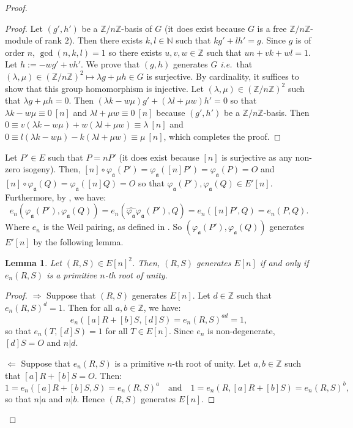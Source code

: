 \documentclass[a4paper,10pt]{report}
\theoremstyle{definition}
\theoremstyle{plain}
\newtheorem{Lemma}[Definition]{Lemma}
\theoremstyle{definition}
\newcommand{\ie}{\emph{i.e.}\ }
\newcommand{\N}{\mathbb{N}}
\newcommand{\Z}{\mathbb{Z}}
\renewcommand{\(}{\left(}
\renewcommand{\)}{\right)}
\newcommand{\mf}[1]{\mathfrak{#1}}
\begin{document}
\begin{proof}
\begin{proof}
Let $(g',h')$ be a $\Z/n\Z$-basis of $G$ (it does exist because $G$ is a free $\Z/n\Z$-module of rank $2$). Then there exists $k,l\in\N$ such that $kg'+lh'=g$. Since $g$ is of order $n$, $\gcd(n,k,l)=1$ so there exists $u,v,w\in\Z$ such that $un+vk+wl=1$. Let $h:=-wg'+vh'$. We prove that $(g,h)$ generates $G$ \ie that $(\lambda,\mu)\in(\Z/n\Z)^2\longmapsto \lambda g+\mu h\in G$ is surjective. By cardinality, it suffices to show that this group homomorphism is injective. Let $(\lambda,\mu)\in(\Z/n\Z)^2$ such that $\lambda g+\mu h=0$. Then $(\lambda k-w\mu)g'+(\lambda l+\mu w)h'=0$ so that $\lambda k-w\mu\equiv 0 \ [n]$ and $\lambda l+\mu w\equiv 0 \ [n]$ because $(g',h')$ be a $\Z/n\Z$-basis.  Then $0\equiv v(\lambda k-w\mu)+w(\lambda l+\mu w)\equiv \lambda \ [n]$ and $0\equiv l(\lambda k-w\mu)-k(\lambda l+\mu w)\equiv \mu \ [n]$, which completes the proof.
\end{proof}

Let $P'\in E$ such that $P=nP'$ (it does exist because $[n]$ is surjective as any non-zero isogeny). Then, $[n]\circ\varphi_{\mf{a}}(P')=\varphi_{\mf{a}}([n]P')=\varphi_{\mf{a}}(P)=O$ and $[n]\circ\varphi_{\mf{a}}(Q)=\varphi_{\mf{a}}([n]Q)=O$ so that $\varphi_{\mf{a}}(P'),\varphi_{\mf{a}}(Q)\in E'[n]$. Furthermore, by \cite[Proposition III.8.2]{Silverman1}, we have:
\[e_n(\varphi_{\mf{a}}(P'),\varphi_{\mf{a}}(Q))=e_n(\widehat{\varphi_{\mf{a}}}\varphi_{\mf{a}}(P'),Q)=e_n([n]P',Q)=e_n(P,Q).\]
Where $e_n$ is the Weil pairing, as defined in \cite[III.8]{Silverman1}. So $(\varphi_{\mf{a}}(P'),\varphi_{\mf{a}}(Q))$ generates $E'[n]$ by the following lemma.

\begin{Lemma}
Let $(R,S)\in E[n]^2$. Then, $(R,S)$ generates $E[n]$ if and only if $e_n(R,S)$ is a primitive $n$-th root of unity.
\end{Lemma}

\begin{proof}
$\Longrightarrow$ Suppose that $(R,S)$ generates $E[n]$. Let $d\in\Z$ such that $e_n(R,S)^d=1$. Then for all $a, b\in \Z$, we have:
\[e_n([a]R+[b]S,[d]S)=e_n(R,S)^{ad}=1,\]
so that $e_n(T,[d]S)=1$ for all $T\in E[n]$. Since $e_n$ is non-degenerate, $[d]S=O$ and $n|d$. 

$\Longleftarrow$ Suppose that $e_n(R,S)$ is a primitive $n$-th root of unity. Let $a, b\in \Z$ such that $[a]R+[b]S=O$. Then:
\[1=e_n([a]R+[b]S,S)=e_n(R,S)^a \quad \mbox{and} \quad 1=e_n(R,[a]R+[b]S)=e_n(R,S)^b,\]
so that $n|a$ and $n|b$. Hence $(R,S)$ generates $E[n]$.
\end{proof}


\end{proof}
\end{document}
